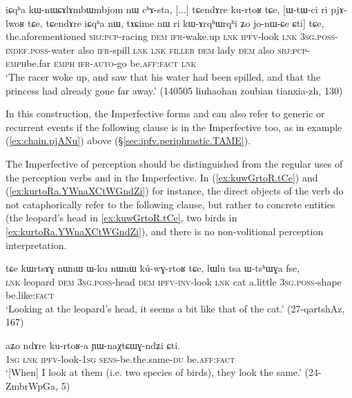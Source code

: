 \begin{exe}
\ex \label{ex:kurtoR.ipfv}
\gll  iɕqʰa kɯ-nɯɕɤlɤmbɯmbjom nɯ cʰɤ-sta, [...] tɕendɤre ku-rtoʁ tɕe, [ɯ-tɯ-ci ri pjɤ-lwoʁ tɕe, tɕendɤre iɕqʰa nɯ, tɤɕime nɯ ri kɯ-ɤrqʰɯ\redp{}rqʰi ʑo jo-nɯ-ɕe ɕti] tɕe, \\
the.aforementioned \textsc{sbj}:\textsc{pcp}-racing \textsc{dem} \textsc{ifr}-wake.up { } \textsc{lnk} \textsc{ipfv}-look \textsc{lnk} \textsc{3sg}.\textsc{poss}-\textsc{indef}.\textsc{poss}-water also \textsc{ifr}-spill  \textsc{lnk} \textsc{lnk} \textsc{filler} \textsc{dem} lady \textsc{dem} also \textsc{sbj}:\textsc{pcp}-\textsc{emph\redp}{}be.far \textsc{emph} \textsc{ifr}-\textsc{auto}-go be.\textsc{aff}:\textsc{fact} \textsc{lnk} \\
\glt `The racer woke up, and saw that his water had been spilled, and that the princess had already gone far away.' (140505 liuhaohan zoubian tianxia-zh, 130)
\end{exe}

In this construction, the Imperfective forms  and  can also refer to generic or recurrent events if the following clause is in the Imperfective too, as in example (\ref{ex:chain.pjANu}) above (§\ref{sec:ipfv.periphrastic.TAME}).

The Imperfective of perception should be distinguished from the regular uses of the perception verbs  and  in the Imperfective. In (\ref{ex:kuwGrtoR.tCe}) and (\ref{ex:kurtoRa.YWnaXCtWGndZi}) for instance, the direct objects of the verb  do not cataphorically refer to the following clause, but rather to concrete entities (the leopard's head in \ref{ex:kuwGrtoR.tCe}, two birds in \ref{ex:kurtoRa.YWnaXCtWGndZi}), and there is no non-volitional perception interpretation.


\begin{exe}
\ex \label{ex:kuwGrtoR.tCe}
\gll  tɕe kɯrtsɤɣ nɯnɯ ɯ-ku nɯnɯ kú-wɣ-rtoʁ tɕe, lɯlu tsa ɯ-tsʰɯɣa fse, \\
\textsc{lnk} leopard \textsc{dem} \textsc{3sg}.\textsc{poss}-head \textsc{dem} \textsc{ipfv}-\textsc{inv}-look \textsc{lnk} cat a.little \textsc{3sg}.\textsc{poss}-shape be.like:\textsc{fact} \\
\glt `Looking at the leopard's head, it seems a bit like that of the cat.' (27-qartshAz, 167)
\end{exe}

\begin{exe}
\ex \label{ex:kurtoRa.YWnaXCtWGndZi}
\gll  aʑo ndɤre ku-rtoʁ-a ɲɯ-naχtɕɯɣ-ndʑi ɕti. \\
\textsc{1sg} \textsc{lnk} \textsc{ipfv}-look-\textsc{1sg} \textsc{sens}-be.the.same-\textsc{du} be.\textsc{aff}:\textsc{fact} \\
\glt `[When] I look at them (i.e. two species of birds), they look the same.' (24-ZmbrWpGa, 5)
\end{exe}

